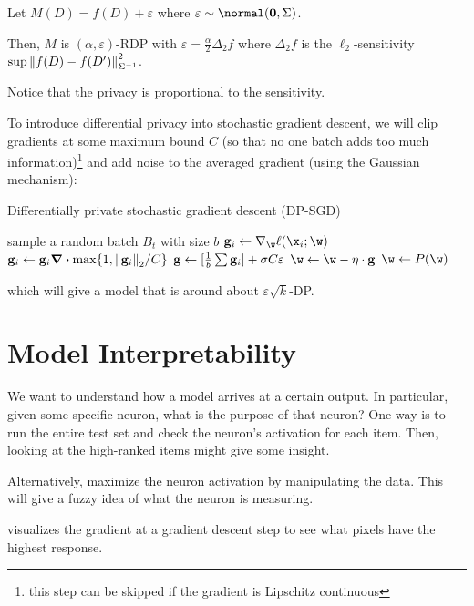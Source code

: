 \documentclass[class=cs480,notes,tikz]{agony}
\begin{document}
\begin{example}
  Let $M(D) = f(D) + \varepsilon$ where $\varepsilon \sim \normal(\vb 0,\Sigma)$.

  Then, $M$ is $(\alpha,\varepsilon)$-RDP with $\varepsilon = \frac\alpha2\Delta_2 f$
  where $\Delta_2f$ is the $\ell_2$-sensitivity $\sup \norm{f(D)-f(D')}^2_{\Sigma^{-1}}$.
\end{example}

Notice that the privacy is proportional to the sensitivity.

To introduce differential privacy into stochastic gradient descent,
we will clip gradients at some maximum bound $C$ (so that no one batch adds too much information)\footnote{this step can be skipped if the gradient is Lipschitz continuous}
and add noise to the averaged gradient (using the Gaussian mechanism):
\begin{algorithm}[H]
  \caption{Differentially private stochastic gradient descent (DP-SGD)}
  \begin{algorithmic}[1]
      \State sample a random batch $B_t$ with size $b$
        \State $\vb g_i \gets \nabla_{\w}\ell(\x_i;\w)$ 
        \State $\vb g_i \gets \vb g_i \div \max\{1,\norm{\vb g_i}_2/C\}$ 
      \EndFor
      \State $\vb g \gets [\frac1b \sum \vb g_i] + \sigma C \varepsilon$ 
      \State $\w \gets \w - \eta \cdot \vb g$ 
      \State $\w \gets P(\w)$  
    \EndFor
  \end{algorithmic}
\end{algorithm}
which will give a model that is around about $\varepsilon\sqrt{k}$-DP.

\section{Model Interpretability}
We want to understand how a model arrives at a certain output.
In particular, given some specific neuron, what is the purpose of that neuron?
One way is to run the entire test set and check the neuron's activation for each item.
Then, looking at the high-ranked items might give some insight.

Alternatively, maximize the neuron activation by manipulating the data.
This will give a fuzzy idea of what the neuron is measuring.

 visualizes the gradient at a gradient descent step
to see what pixels have the highest response.
\end{document}
